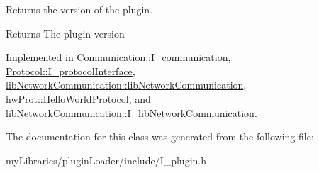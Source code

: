 Returns the version of the plugin. 

\begin{DoxyReturn}{Returns}
The plugin version 
\end{DoxyReturn}


Implemented in \mbox{\hyperlink{classCommunication_1_1I__communication_a3ff1f75536d5a7394ef736353bd29e53}{Communication\+::\+I\+\_\+communication}}, \mbox{\hyperlink{classProtocol_1_1I__protocolInterface_abbdaeb43eba4c18b57e6f7010d9209bc}{Protocol\+::\+I\+\_\+protocol\+Interface}}, \mbox{\hyperlink{classlibNetworkCommunication_1_1libNetworkCommunication_a78dce6f61316f1f2068c0f03c7cc4b32}{lib\+Network\+Communication\+::lib\+Network\+Communication}}, \mbox{\hyperlink{classhwProt_1_1HelloWorldProtocol_ab4c559084de5fa090d75672eff462841}{hw\+Prot\+::\+Hello\+World\+Protocol}}, and \mbox{\hyperlink{classlibNetworkCommunication_1_1I__libNetworkCommunication_a07a5da99fc896208065f34aa89453499}{lib\+Network\+Communication\+::\+I\+\_\+lib\+Network\+Communication}}.



The documentation for this class was generated from the following file\+:\begin{DoxyCompactItemize}
\item 
my\+Libraries/plugin\+Loader/include/I\+\_\+plugin.\+h\end{DoxyCompactItemize}
